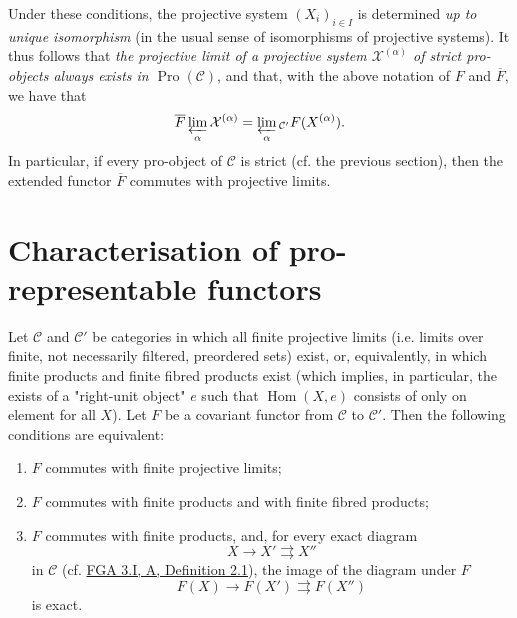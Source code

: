   Under these conditions, the projective system \((X_i)_{i\in  I}\) is determined \emph{up to unique isomorphism} (in the usual sense of isomorphisms of projective systems).
  It thus follows that \emph{the projective limit of a projective system \(\mathcal {X}^{(\alpha )}\) of strict pro-objects always exists in \(\operatorname {Pro}(\mathcal {C})\)}, and that, with the above notation of \(F\) and \(\overline {F}\), we have that
  \[     \overline {F}\varprojlim _\alpha \mathcal {X}^{(\alpha )}     = \varprojlim _\alpha {}_{\mathcal {C}'}F(X^{(\alpha )}).   \]
  In particular, if every pro-object of \(\mathcal {C}\) is strict (cf. the previous section), then the extended functor \(\overline {F}\) commutes with projective limits.\section{Characterisation of pro-representable functors}\label{fga3.ii-a.3}\par{}Let \(\mathcal {C}\) and \(\mathcal {C}'\) be categories in which all finite projective limits (i.e. limits over finite, not necessarily filtered, preordered sets) exist, or, equivalently, in which finite products and finite fibred products exist (which implies, in particular, the exists of a "right-unit object" \(e\) such that \(\operatorname {Hom}(X,e)\) consists of only on element for all \(X\)).
  Let \(F\) be a covariant functor from \(\mathcal {C}\) to \(\mathcal {C}'\).
  Then the following conditions are equivalent:

  
 \begin{enumerate}
    
 \item[i.]
      \(F\) commutes with finite projective limits;
    


    
 \item[ii.]
      \(F\) commutes with finite products and with finite fibred products;
    


    
 \item[iii.]
      \(F\) commutes with finite products, and, for every exact diagram
      \[         X\to  X'\rightrightarrows  X''       \]
      in \(\mathcal {C}\) (cf. \hyperref[fga3.i-a.2-definition-2.1]{FGA 3.I, A, Definition 2.1}), the image of the diagram under \(F\)
      \[         F(X)\to  F(X')\rightrightarrows  F(X'')       \]
      is exact.
    

  \end{enumerate}


